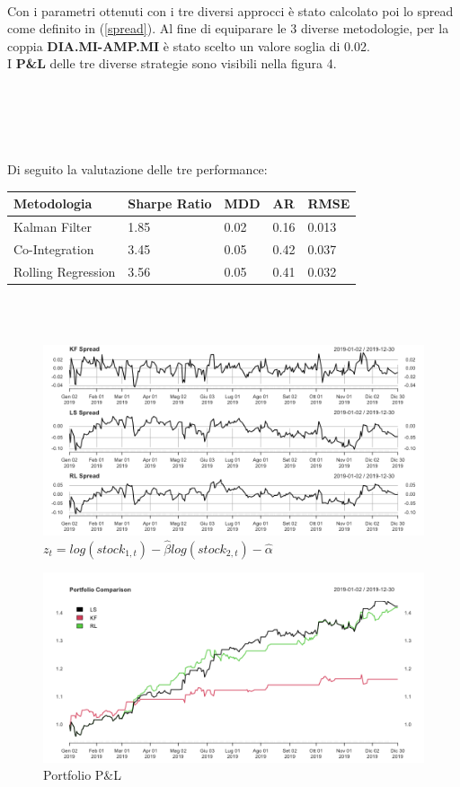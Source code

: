 \documentclass[]{article}
\begin{document}
\\
Con i parametri ottenuti con i tre diversi approcci è stato calcolato poi lo spread come definito in (\ref{spread}).
Al fine di equiparare le 3 diverse metodologie, per la coppia \textbf{DIA.MI-AMP.MI} è stato scelto un valore soglia di 0.02.
\\
I \textbf{P\&L} delle tre diverse strategie sono visibili nella figura 4.
\\\\\\\\\\\\
Di seguito la valutazione delle tre performance:
\begin{center}
\begin{tabular}{ p{3cm}p{2cm}p{1cm}p{1cm}p{2cm} }
	\hline
	Metodologia  & Sharpe Ratio & MDD & AR & RMSE\\
	\hline
	Kalman Filter & 1.85 & 0.02 & 0.16 & 0.013 \\
	Co-Integration & 3.45 & 0.05 & 0.42 & 0.037 \\
	Rolling Regression & 3.56 & 0.05 & 0.41 & 0.032 \\
	\hline
\end{tabular}
\end{center}
\
\\\\
\begin{figure}[h]
	\caption{$	z_t= log(stock_{1,t}) - \hat{\beta}log(stock_{2,t}) - \hat{\alpha}$}
	\centering
	\includegraphics[scale=0.3]{spread_dia_amp.png}
\end{figure}

\begin{figure}[h]
	\caption{Portfolio P\&L}
	\centering
	\includegraphics[scale=0.3]{comparison_dia_amp.png}
\end{figure}
\end{document}
